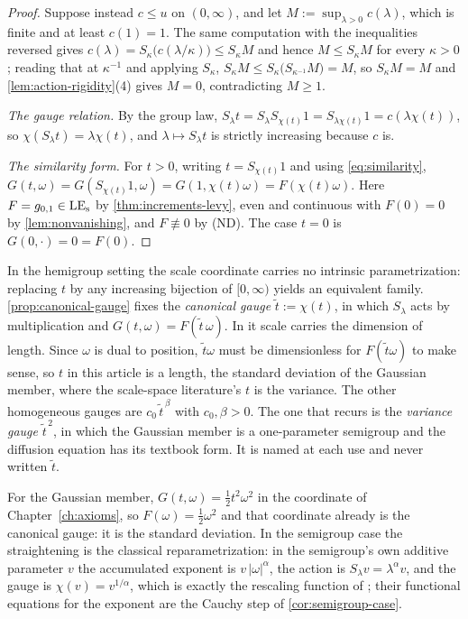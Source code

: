 \begin{proof}
Suppose instead $c \le u$ on $(0,\infty)$, and let $M := \sup_{\lambda > 0} c(\lambda)$, which
is finite and at least $c(1) = 1$. The same computation with the inequalities reversed gives
$c(\lambda) = S_\kappa\bigl(c(\lambda/\kappa)\bigr) \le S_\kappa M$ and hence
$M \le S_\kappa M$ for every $\kappa > 0$; reading that at $\kappa^{-1}$ and applying $S_\kappa$,
$S_\kappa M \le S_\kappa\bigl(S_{\kappa^{-1}}M\bigr) = M$, so $S_\kappa M = M$ and
\ref{lem:action-rigidity}(4) gives $M = 0$, contradicting $M \ge 1$.

\emph{The gauge relation.} By the group law,
$S_\lambda t = S_\lambda S_{\chi(t)}1 = S_{\lambda\chi(t)}1 = c(\lambda\chi(t))$, so
$\chi(S_\lambda t) = \lambda\chi(t)$, and $\lambda \mapsto S_\lambda t$ is strictly increasing
because $c$ is.

\emph{The similarity form.} For $t > 0$, writing $t = S_{\chi(t)}1$ and using
\ref{eq:similarity}, $G(t,\omega) = G(S_{\chi(t)}1,\omega) = G(1,\chi(t)\omega) =
F(\chi(t)\omega)$. Here $F = g_{0,1} \in \mathrm{LE}_{\mathrm{s}}$ by \ref{thm:increments-levy}, even and
continuous with $F(0) = 0$ by \ref{lem:nonvanishing}, and $F \not\equiv 0$ by (ND). The case
$t = 0$ is $G(0,\cdot) = 0 = F(0)$.
\end{proof}

\begin{remark}\label{rem:gauge-freedom}
In the hemigroup setting the scale coordinate carries no intrinsic parametrization: replacing
$t$ by any increasing bijection of $[0,\infty)$ yields an equivalent family.
\ref{prop:canonical-gauge} fixes the \emph{canonical gauge} $\tilde t := \chi(t)$, in which
$S_\lambda$ acts by multiplication and $G(t,\omega) = F(\tilde t\,\omega)$. In it scale carries
the dimension of length. Since $\omega$ is dual to position, $\tilde t\omega$ must be
dimensionless for $F(\tilde t\omega)$ to make sense, so $t$ in this article is a length, the
standard deviation of the Gaussian member, where the scale-space literature's $t$ is the
variance. The other homogeneous gauges are $c_0\,\tilde t^{\,\beta}$ with $c_0, \beta > 0$. The
one that recurs is the \emph{variance gauge} $\tilde t^{\,2}$, in which the Gaussian member is a
one-parameter semigroup and the diffusion equation has its textbook form. It is named at each
use and never written $\tilde t$.
\end{remark}

For the Gaussian member, $G(t,\omega) = \tfrac12t^2\omega^2$ in the coordinate of
Chapter~\ref{ch:axioms}, so $F(\omega) = \tfrac12\omega^2$ and that coordinate already is the
canonical gauge: it is the standard deviation. In the semigroup case the straightening is the
classical reparametrization: in the semigroup's own additive parameter $v$ the accumulated
exponent is $v\,|\omega|^\alpha$, the action is $S_\lambda v = \lambda^\alpha v$, and the gauge
is $\chi(v) = v^{1/\alpha}$, which is exactly the rescaling function of
; their functional equations for the exponent are the Cauchy step
of \ref{cor:semigroup-case}.
